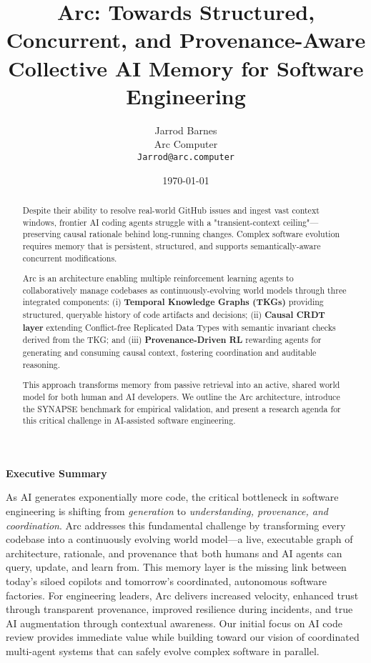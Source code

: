 \documentclass{article}
\title{Arc: Towards Structured, Concurrent, and Provenance-Aware Collective AI Memory for Software Engineering}
\author{%
  Jarrod Barnes\\
  Arc Computer\\
  \texttt{Jarrod@arc.computer}
}
\date{\today}
\begin{document}
\maketitle

\begin{center}
\large\textbf{Executive Summary}
\end{center}
\noindent As AI generates exponentially more code, the critical bottleneck in software engineering is shifting from \textit{generation} to \textit{understanding, provenance, and coordination}. Arc addresses this fundamental challenge by transforming every codebase into a continuously evolving world model—a live, executable graph of architecture, rationale, and provenance that both humans and AI agents can query, update, and learn from. This memory layer is the missing link between today's siloed copilots and tomorrow's coordinated, autonomous software factories. For engineering leaders, Arc delivers increased velocity, enhanced trust through transparent provenance, improved resilience during incidents, and true AI augmentation through contextual awareness. Our initial focus on AI code review provides immediate value while building toward our vision of coordinated multi-agent systems that can safely evolve complex software in parallel.

\vspace{0.5cm}
\begin{abstract}
Despite their ability to resolve real-world GitHub issues and ingest vast context windows, frontier AI coding agents struggle with a "transient-context ceiling"—preserving causal rationale behind long-running changes. Complex software evolution requires memory that is persistent, structured, and supports semantically-aware concurrent modifications.

Arc is an architecture enabling multiple reinforcement learning agents to collaboratively manage codebases as continuously-evolving world models through three integrated components: (i) \textbf{Temporal Knowledge Graphs (TKGs)} providing structured, queryable history of code artifacts and decisions; (ii) \textbf{Causal CRDT layer} extending Conflict-free Replicated Data Types with semantic invariant checks derived from the TKG; and (iii) \textbf{Provenance-Driven RL} rewarding agents for generating and consuming causal context, fostering coordination and auditable reasoning.

This approach transforms memory from passive retrieval into an active, shared world model for both human and AI developers. We outline the Arc architecture, introduce the SYNAPSE benchmark for empirical validation, and present a research agenda for this critical challenge in AI-assisted software engineering.
\end{abstract}
\end{document}
